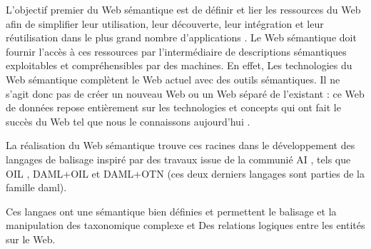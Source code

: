 



      L'objectif premier du Web sémantique est de définir et lier les
      ressources du Web afin de simplifier leur utilisation, leur
      découverte, leur intégration et leur réutilisation dans le plus grand
      nombre d'applications \cite{berners2001semantic}. Le Web sémantique
      doit fournir l'accès à ces ressources par l'intermédiaire de
      descriptions sémantiques exploitables et compréhensibles par des
      machines. En effet, Les technologies du Web sémantique complètent le
      Web actuel avec des outils sémantiques. Il ne s'agit donc pas de créer
      un nouveau Web ou un Web séparé de l'existant : ce Web de données
      repose entièrement sur les technologies et concepts qui ont fait le
      succès du Web tel que nous le connaissons aujourd'hui
      \cite{bertails2010web}.

      La réalisation du Web sémantique trouve ces racines dans le
      développement des langages de balisage inspiré par des travaux issue
      de la communié AI \cite{mcilraith2001semantic}, tels que \textsc{OIL}
      \cite{fensel2001oil}, \textsc{DAML+OIL} \cite{horrocks2002daml+oil} et
      \textsc{DAML+OTN} \cite{mcguinness2003daml} (ces deux derniers
      langages sont parties de la famille \acrshort{daml}).

      Ces langaes ont une sémantique bien définies et permettent le balisage
      et la manipulation des taxonomique complexe et Des relations logiques
      entre les entités sur le Web. \cite{fensel2000creating}

